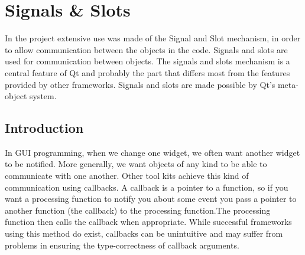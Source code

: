 %
\section{Signals \& Slots}
\label{ref:soft-signal-slot}
In the project extensive use was made of the Signal and Slot mechanism, in order
 to allow communication between the objects in the code. Signals and slots are
used for communication between objects. The signals and slots mechanism is a
central feature of Qt and probably the part that differs most from the features
provided by other frameworks. Signals and slots are made possible by Qt’s
meta-object system.\cite{Qt:signal-slot}

\subsection{Introduction}
\label{ssec:soft-intro}
In GUI programming, when we change one widget, we often want another widget to
be notified. More generally, we want objects of any kind to be able to
communicate with one another.
%
Other tool kits achieve this kind of communication using callbacks. A callback is
a pointer to a function, so if you want a processing function to notify you
about some event you pass a pointer to another function (the callback) to the
processing function.\linebreak The processing function then calls the callback when
appropriate. While successful frameworks using this method do exist, callbacks
can be unintuitive and may suffer from problems in ensuring the type-correctness
of callback arguments.\cite{Qt:signal-slot}

